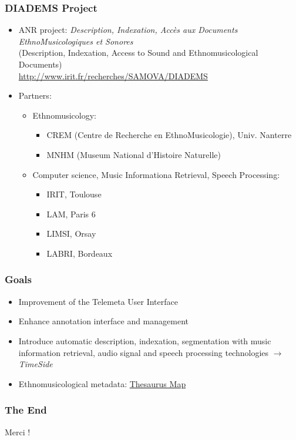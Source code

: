 \documentclass[10pt, final, hyperref, table]{beamer}
\begin{document}
\begin{frame}
\frametitle{DIADEMS Project}
\begin{itemize}
\item ANR project: \emph{Description, Indexation, Accès aux Documents EthnoMusicologiques et Sonores} \\
(Description, Indexation, Access to Sound and Ethnomusicological Documents)\\
\url{http://www.irit.fr/recherches/SAMOVA/DIADEMS}
\item Partners:
  \begin{itemize}
  \item Ethnomusicology:
    \begin{itemize}
    \item CREM (Centre de Recherche en EthnoMusicologie),
      Univ. Nanterre
    \item MNHM (Museum National d'Histoire Naturelle)
    \end{itemize}
  \item Computer science, Music Informationa Retrieval, Speech Processing:
    \begin{itemize}
    \item IRIT, Toulouse
    \item LAM, Paris 6
    \item LIMSI, Orsay
    \item LABRI, Bordeaux
    \end{itemize}

  \end{itemize}

\end{itemize}
\end{frame}
\begin{frame}
\frametitle{Goals}
\begin{itemize}
\item Improvement of the Telemeta User Interface
\item Enhance annotation interface and management
\item Introduce automatic description, indexation, segmentation with music information retrieval, audio signal and speech processing technologies $\rightarrow$ \emph{TimeSide} 
\item Ethnomusicological metadata: \href{Thesaurus.html}{Thesaurus
    Map}
\end{itemize}

\end{frame}
\begin{frame}
\frametitle{The End}
\begin{center}
  \LARGE Merci !
\end{center}
\end{frame}
\end{document}
